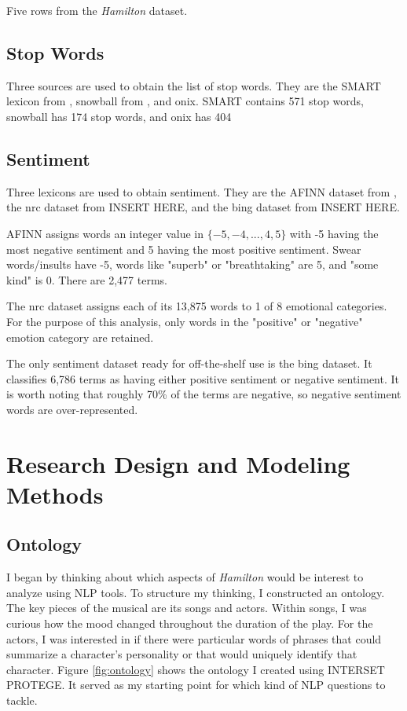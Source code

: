 \documentclass{article}
\begin{document}
\begin{table}
\caption{Five rows from the \emph{Hamilton} dataset.}
\label{tab:example}

\end{table}

\subsection{Stop Words}

Three sources are used to obtain the list of stop words. They are the SMART lexicon from \cite{Lewis2004}, snowball from \cite{snowball}, and onix. SMART contains 571 stop words, snowball has 174 stop words, and onix has 404

\subsection{Sentiment}

Three lexicons are used to obtain sentiment. They are the AFINN dataset from \cite{nielsen11}, the nrc dataset from INSERT HERE, and the bing dataset from INSERT HERE.

AFINN assigns words an integer value in $\{-5, -4, ..., 4, 5\}$ with -5 having the most negative sentiment and 5 having the most positive sentiment. Swear words/insults have -5, words like "superb" or "breathtaking" are 5, and "some kind" is 0. There are 2,477 terms. 

The nrc dataset assigns each of its 13,875 words to 1 of 8 emotional categories. For the purpose of this analysis, only words in the "positive" or "negative" emotion category are retained. 

The only sentiment dataset ready for off-the-shelf use is the bing dataset. It classifies 6,786 terms as having either positive sentiment or negative sentiment. It is worth noting that roughly 70\% of the terms are negative, so negative sentiment words are over-represented. 


\section{Research Design and Modeling Methods}

\subsection{Ontology}

I began by thinking about which aspects of \emph{Hamilton} would be interest to analyze using NLP tools. To structure my thinking, I constructed an ontology. The key pieces of the musical are its songs and actors. Within songs, I was curious how the mood changed throughout the duration of the play. For the actors, I was interested in if there were particular words of phrases that could summarize a character's personality or that would uniquely identify that character. Figure \ref{fig:ontology} shows the ontology I created using INTERSET PROTEGE. It served as my starting point for which kind of NLP questions to tackle. 
\end{document}
